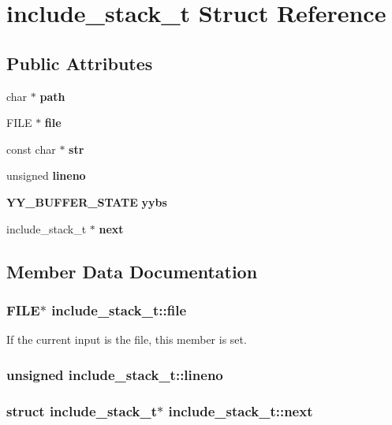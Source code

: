 \section{include\_\-stack\_\-t Struct Reference}
\label{structinclude__stack__t}
\subsection*{Public Attributes}
\begin{CompactItemize}
\item 
char $\ast$ {\bf path}
\item 
FILE $\ast$ {\bf file}
\item 
const char $\ast$ {\bf str}
\item 
unsigned {\bf lineno}
\item 
{\bf YY\_\-BUFFER\_\-STATE} {\bf yybs}
\item 
include\_\-stack\_\-t $\ast$ {\bf next}
\end{CompactItemize}


\subsection{Member Data Documentation}
\subsubsection{\setlength{\rightskip}{0pt plus 5cm}FILE$\ast$ include\_\-stack\_\-t::file}\label{structinclude__stack__t_m1}


If the current input is the file, this member is set. 
\subsubsection{\setlength{\rightskip}{0pt plus 5cm}unsigned include\_\-stack\_\-t::lineno}\label{structinclude__stack__t_m3}


\subsubsection{\setlength{\rightskip}{0pt plus 5cm}struct include\_\-stack\_\-t$\ast$ include\_\-stack\_\-t::next}\label{structinclude__stack__t_m5}


